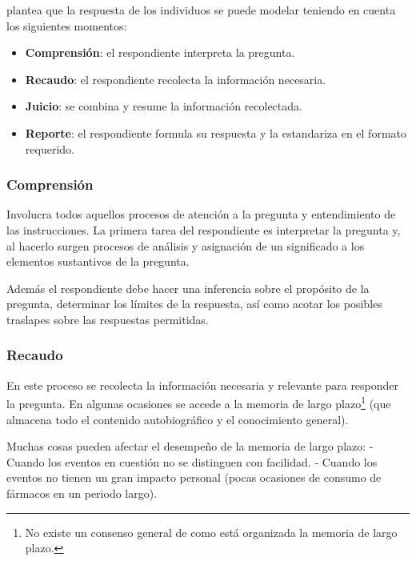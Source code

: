 \documentclass[
  10pt,
  spanish,
]{book}
\providecommand{\tightlist}{%
  \setlength{\itemsep}{0pt}\setlength{\parskip}{0pt}}
\begin{document}
\citet{Krosnick1999} plantea que la respuesta de los individuos se puede modelar teniendo en cuenta los siguientes momentos:

\begin{itemize}
\tightlist
\item
  \textbf{Comprensión}: el respondiente interpreta la pregunta.
\item
  \textbf{Recaudo}: el respondiente recolecta la información necesaria.
\item
  \textbf{Juicio}: se combina y resume la información recolectada.
\item
  \textbf{Reporte}: el respondiente formula su respuesta y la estandariza en el formato requerido.
\end{itemize}

\hypertarget{comprensiuxf3n}{%
\subsubsection*{Comprensión}\label{comprensiuxf3n}}

Involucra todos aquellos procesos de atención a la pregunta y entendimiento de las instrucciones. La primera tarea del respondiente es interpretar la pregunta y, al hacerlo surgen procesos de análisis y asignación de un significado a los elementos sustantivos de la pregunta.

Además el respondiente debe hacer una inferencia sobre el propósito de la pregunta, determinar los límites de la respuesta, así como acotar los posibles traslapes sobre las respuestas permitidas.

\hypertarget{recaudo}{%
\subsubsection*{Recaudo}\label{recaudo}}

En este proceso se recolecta la información necesaria y relevante para responder la pregunta. En algunas ocasiones se accede a la memoria de largo plazo\footnote{No existe un consenso general de como está organizada la memoria de largo plazo.} (que almacena todo el contenido autobiográfico y el conocimiento general).

Muchas cosas pueden afectar el desempeño de la memoria de largo plazo:
- Cuando los eventos en cuestión no se distinguen con facilidad.
- Cuando los eventos no tienen un gran impacto personal (pocas ocasiones de consumo de fármacos en un periodo largo).
\end{document}
